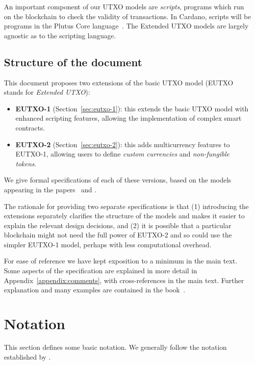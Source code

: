 \documentclass[a4paper]{article}
\begin{document}
An important component of our UTXO models are \textit{scripts},
programs which run on the blockchain to check the validity of
transactions.  In Cardano, scripts will be programs in the Plutus Core
language~\citep{Plutus-Core-spec}. The Extended UTXO models are largely
agnostic as to the scripting language.


\subsection{Structure of the document}
\label{sec:doc-structure}
This document proposes two extensions of the basic UTXO model (EUTXO
stands for \textit{Extended UTXO}):

\begin{itemize}
  \item \textbf{EUTXO-1} (Section~\ref{sec:eutxo-1}): this extends the
    basic UTXO model with enhanced scripting features, allowing the
    implementation of complex smart contracts.
  \item \textbf{EUTXO-2} (Section~\ref{sec:eutxo-2}): this adds
    multicurrency features to EUTXO-1, allowing users to define
    \textit{custom currencies} and \textit{non-fungible tokens}.
\end{itemize}

\noindent We give formal specifications of each of these versions,
based on the models appearing in the
papers~\citep{Zahnentferner18-Chimeric} and
\citep{Zahnentferner18-UTxO}.

\medskip

The rationale for providing two separate specifications is that (1)
introducing the extensions separately clarifies the structure of the
models and makes it easier to explain the relevant design decisions,
and (2) it is possible that a particular blockchain might not need the
full power of EUTXO-2 and so could use the simpler EUTXO-1 model,
perhaps with less computational overhead.

\medskip

For ease of reference we have kept exposition to a minimum in the main
text.  Some aspects of the specification are explained in more detail
in Appendix~\ref{appendix:comments}, with cross-references in the main
text.  Further explanation and many examples are contained in the
book~\citep{Plutus-book}.



\newpage
\section{Notation}
This section defines some basic notation.  We generally follow the
notation established by \citep{Zahnentferner18-UTxO}.
\end{document}

